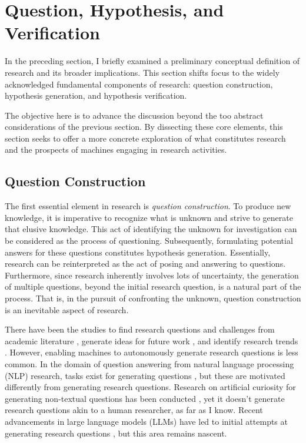 \section{Question, Hypothesis, and  Verification}
\label{section-question-hypothesis-verification}
In the preceding section, I briefly examined a preliminary conceptual definition of research and its broader implications. This section shifts focus to the widely acknowledged fundamental components of research: question construction, hypothesis generation, and hypothesis verification. 

The objective here is to advance the discussion beyond the too abstract considerations of the previous section. By dissecting these core elements, this section seeks to offer a more concrete exploration of what constitutes research and the prospects of machines engaging in research activities. 

\subsection{Question Construction}
\label{section-question-construction}
The first essential element in research is \textit{question construction}. To produce new knowledge, it is imperative to recognize what is unknown and strive to generate that elusive knowledge. This act of identifying the unknown for investigation can be considered as the process of questioning. Subsequently, formulating potential answers for these questions constitutes hypothesis generation. Essentially, research can be reinterpreted as the act of posing and answering to questions. Furthermore, since research inherently involves lots of uncertainty, the generation of multiple questions, beyond the initial research question, is a natural part of the process. That is, in the pursuit of confronting the unknown, question construction is an inevitable aspect of research.

There have been the studies to find research questions and challenges from academic literature \cite{lahav2022search,oppenlaender2023mapping,surita2020can}, generate ideas for future work \cite{wang2019paperrobot}, and identify research trends \cite{krenn2020predicting,krenn2022predicting}. However, enabling machines to autonomously generate research questions is less common. In the domain of question answering from natural language processing (NLP) research, tasks exist for generating questions \cite{pan2019recent,zhang2021review}, but these are motivated differently from generating research questions. Research on artificial curiosity for generating non-textual questions has been conducted \cite{schmidhuber1991possibility}, yet it doesn't generate research questions akin to a human researcher, as far as I know. Recent advancements in large language models (LLMs) have led to initial attempts at generating research questions \cite{liu2023creative,lahat2023evaluating}, but this area remains nascent.

